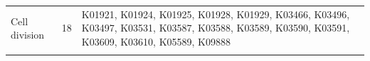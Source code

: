\begin{longtable}{@{}p{3.2cm} r p{9.5cm}@{}}
\addlinespace
Cell division & 18 & K01921, K01924, K01925, K01928, K01929, K03466, K03496, K03497, K03531, K03587, K03588, K03589, K03590, K03591, K03609, K03610, K05589, K09888 \\
\addlinespace
\end{longtable}